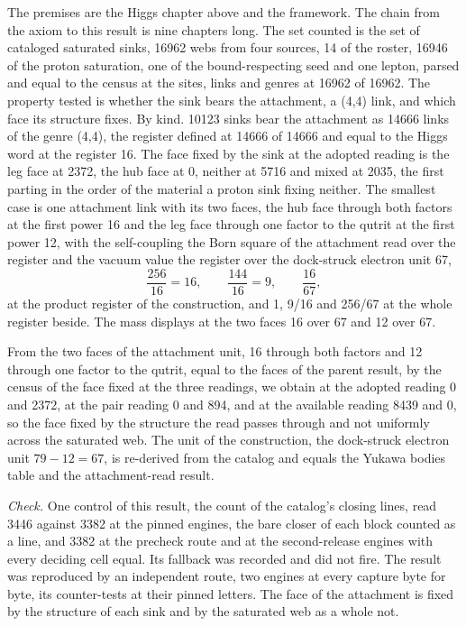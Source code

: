 \begin{chproof}[census]
The premises are the Higgs chapter above and the framework. The chain from the axiom to this result is nine chapters long. The set counted is the set of cataloged saturated sinks, 16962 webs from four sources, 14 of the roster, 16946 of the proton saturation, one of the bound-respecting seed and one lepton, parsed and equal to the census at the sites, links and genres at 16962 of 16962. The property tested is whether the sink bears the attachment, a (4,4) link, and which face its structure fixes. By kind. 10123 sinks bear the attachment as 14666 links of the genre (4,4), the register defined at 14666 of 14666 and equal to the Higgs word at the register 16. The face fixed by the sink at the adopted reading is the leg face at 2372, the hub face at 0, neither at 5716 and mixed at 2035, the first parting in the order of the material a proton sink fixing neither. The smallest case is one attachment link with its two faces, the hub face through both factors at the first power 16 and the leg face through one factor to the qutrit at the first power 12, with the self-coupling the Born square of the attachment read over the register and the vacuum value the register over the dock-struck electron unit 67,
\begin{equation}
\frac{256}{16} = 16, \qquad \frac{144}{16} = 9, \qquad \frac{16}{67} ,
\end{equation}
at the product register of the construction, and 1, 9/16 and 256/67 at the whole register beside. The mass displays at the two faces 16 over 67 and 12 over 67.

From the two faces of the attachment unit, 16 through both factors and 12 through one factor to the qutrit, equal to the faces of the parent result, by the census of the face fixed at the three readings, we obtain at the adopted reading 0 and 2372, at the pair reading 0 and 894, and at the available reading 8439 and 0, so the face fixed by the structure the read passes through and not uniformly across the saturated web. The unit of the construction, the dock-struck electron unit $79 - 12 = 67$, is re-derived from the catalog and equals the Yukawa bodies table and the attachment-read result.

\emph{Check.} One control of this result, the count of the catalog's closing lines, read 3446 against 3382 at the pinned engines, the bare closer of each block counted as a line, and 3382 at the precheck route and at the second-release engines with every deciding cell equal. Its fallback was recorded and did not fire. The result was reproduced by an independent route, two engines at every capture byte for byte, its counter-tests at their pinned letters.
The face of the attachment is fixed by the structure of each sink and by the saturated web as a whole not.
\end{chproof}
\label{chend:VI-10-D536188-w-hgau}
